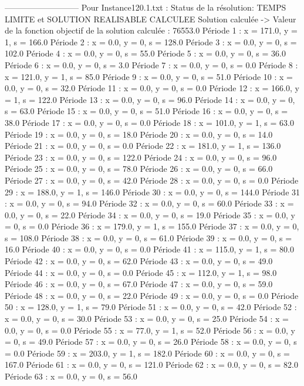 ---------------------------
Pour Instance120.1.txt :
Status de la résolution: TEMPS LIMITE et SOLUTION REALISABLE CALCULEE
Solution calculée
-> Valeur de la fonction objectif de la solution calculée :  76553.0
Période 1 : x = 171.0, y = 1, s = 166.0
Période 2 : x = 0.0, y = 0, s = 128.0
Période 3 : x = 0.0, y = 0, s = 102.0
Période 4 : x = 0.0, y = 0, s = 55.0
Période 5 : x = 0.0, y = 0, s = 36.0
Période 6 : x = 0.0, y = 0, s = 3.0
Période 7 : x = 0.0, y = 0, s = 0.0
Période 8 : x = 121.0, y = 1, s = 85.0
Période 9 : x = 0.0, y = 0, s = 51.0
Période 10 : x = 0.0, y = 0, s = 32.0
Période 11 : x = 0.0, y = 0, s = 0.0
Période 12 : x = 166.0, y = 1, s = 122.0
Période 13 : x = 0.0, y = 0, s = 96.0
Période 14 : x = 0.0, y = 0, s = 63.0
Période 15 : x = 0.0, y = 0, s = 51.0
Période 16 : x = 0.0, y = 0, s = 38.0
Période 17 : x = 0.0, y = 0, s = 0.0
Période 18 : x = 101.0, y = 1, s = 63.0
Période 19 : x = 0.0, y = 0, s = 18.0
Période 20 : x = 0.0, y = 0, s = 14.0
Période 21 : x = 0.0, y = 0, s = 0.0
Période 22 : x = 181.0, y = 1, s = 136.0
Période 23 : x = 0.0, y = 0, s = 122.0
Période 24 : x = 0.0, y = 0, s = 96.0
Période 25 : x = 0.0, y = 0, s = 78.0
Période 26 : x = 0.0, y = 0, s = 66.0
Période 27 : x = 0.0, y = 0, s = 42.0
Période 28 : x = 0.0, y = 0, s = 0.0
Période 29 : x = 188.0, y = 1, s = 146.0
Période 30 : x = 0.0, y = 0, s = 144.0
Période 31 : x = 0.0, y = 0, s = 94.0
Période 32 : x = 0.0, y = 0, s = 60.0
Période 33 : x = 0.0, y = 0, s = 22.0
Période 34 : x = 0.0, y = 0, s = 19.0
Période 35 : x = 0.0, y = 0, s = 0.0
Période 36 : x = 179.0, y = 1, s = 155.0
Période 37 : x = 0.0, y = 0, s = 108.0
Période 38 : x = 0.0, y = 0, s = 61.0
Période 39 : x = 0.0, y = 0, s = 16.0
Période 40 : x = 0.0, y = 0, s = 0.0
Période 41 : x = 115.0, y = 1, s = 80.0
Période 42 : x = 0.0, y = 0, s = 62.0
Période 43 : x = 0.0, y = 0, s = 49.0
Période 44 : x = 0.0, y = 0, s = 0.0
Période 45 : x = 112.0, y = 1, s = 98.0
Période 46 : x = 0.0, y = 0, s = 67.0
Période 47 : x = 0.0, y = 0, s = 59.0
Période 48 : x = 0.0, y = 0, s = 22.0
Période 49 : x = 0.0, y = 0, s = 0.0
Période 50 : x = 128.0, y = 1, s = 79.0
Période 51 : x = 0.0, y = 0, s = 42.0
Période 52 : x = 0.0, y = 0, s = 30.0
Période 53 : x = 0.0, y = 0, s = 25.0
Période 54 : x = 0.0, y = 0, s = 0.0
Période 55 : x = 77.0, y = 1, s = 52.0
Période 56 : x = 0.0, y = 0, s = 49.0
Période 57 : x = 0.0, y = 0, s = 26.0
Période 58 : x = 0.0, y = 0, s = 0.0
Période 59 : x = 203.0, y = 1, s = 182.0
Période 60 : x = 0.0, y = 0, s = 167.0
Période 61 : x = 0.0, y = 0, s = 121.0
Période 62 : x = 0.0, y = 0, s = 82.0
Période 63 : x = 0.0, y = 0, s = 56.0
